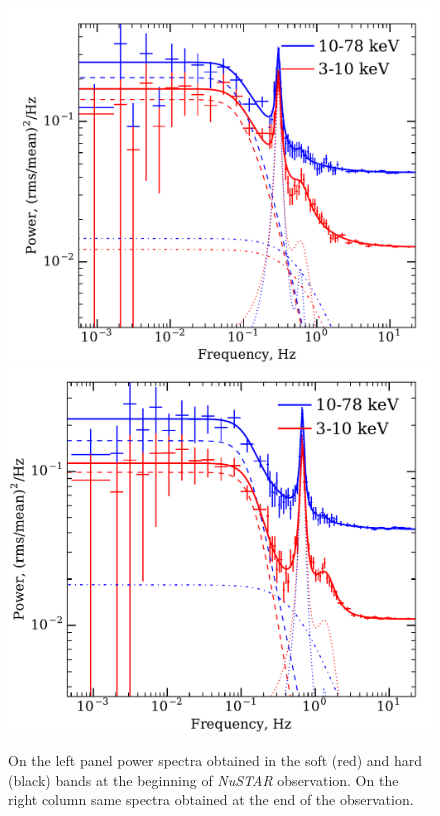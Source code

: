 \documentclass[a4paper,fleqn,usenatbib]{mnras}
\begin{document}
\begin{figure}
        \includegraphics[trim=0 0 0 0.65cm, clip, width=\columnwidth]{NuFirst.pdf}
        \includegraphics[width=\columnwidth, height = 0.83\columnwidth]{NuLast.pdf}
        \caption{On the left panel power spectra obtained in the soft (red) and hard (black) bands at the beginning of {\it NuSTAR} observation. 
        On the right column same spectra obtained at the end of the observation.}
        \label{fig:ps_example}
\end{figure}
\end{document}
